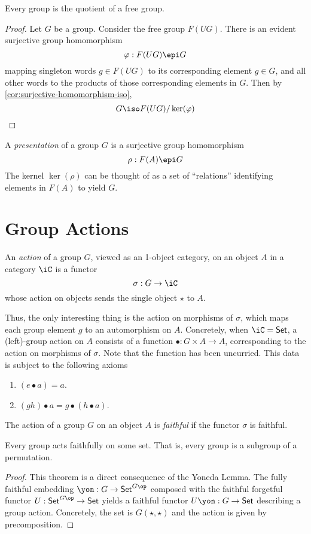 \documentclass{amsart}
\begin{document}
\begin{thm}
  Every group is the quotient of a free group.
\end{thm}
\begin{proof}
  Let $G$ be a group.
  Consider the free group $F(UG)$.
  There is an evident surjective group homomorphism
  \[
    \varphi : F(UG) \epi G
  \]
  mapping singleton words $g \in F(UG)$ to its corresponding element $g \in G$, and all other words to the products of those corresponding elements in $G$.
  Then by \cref{cor:surjective-homomorphism-iso},
  \[
    G \iso F(UG)/\ker(\varphi)
  \]
\end{proof}

\begin{defn}
  A \emph{presentation} of a group $G$ is a surjective group homomorphism
  \[
    \rho : F(A) \epi G
  \]
  The kernel $\ker(\rho)$ can be thought of as a set of ``relations'' identifying elements in $F(A)$ to yield $G$.
\end{defn}

\section{Group Actions}
\label{sec:group-actions}

\begin{defn}[Actions]
  An \emph{action} of a group $G$, viewed as an 1-object category, on an object $A$ in a category $\iC$ is a functor
  \[
    \sigma : G \to \iC
  \]
  whose action on objects sends the single object $\star$ to $A$.
\end{defn}

Thus, the only interesting thing is the action on morphisms of $\sigma$, which maps each group element $g$ to an automorphism on $A$.
Concretely, when $\iC = \mathsf{Set}$, a (left)-group action on $A$ consists of a function $\bullet : G \times A \to A$, corresponding to the action on morphisms of $\sigma$.
Note that the function has been uncurried.
This data is subject to the following axioms
\begin{enumerate}
\item $(e \bullet a) = a$.
\item $(gh) \bullet a = g \bullet (h \bullet a)$.
\end{enumerate}

\begin{defn}
  The action of a group $G$ on an object $A$ is \emph{faithful} if the functor $\sigma$ is faithful.
\end{defn}

\begin{thm}
  Every group acts faithfully on some set.
  That is, every group is a subgroup of a permutation.
\end{thm}
\begin{proof}
  This theorem is a direct consequence of the Yoneda Lemma.
  The fully faithful embedding $\yon : G \to \mathsf{Set}^{G\op}$ composed with the faithful forgetful functor $U : \mathsf{Set}^{G\op} \to \mathsf{Set}$ yields a faithful functor $U\yon : G \to \mathsf{Set}$ describing a group action.
  Concretely, the set is $G(\star,\star)$ and the action is given by precomposition.
\end{proof}
\end{document}
